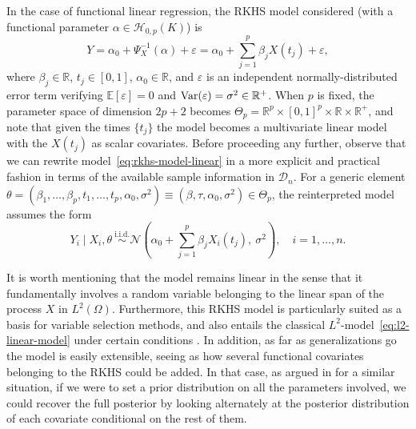 \documentclass[ba]{imsart}
\numberwithin{equation}{section}
\theoremstyle{plain}
\renewcommand{\epsilon}{\varepsilon}
\newcommand{\R}{\mathbb{R}}
\newcommand{\E}{\mathbb{E}}
\newcommand{\Var}{\ensuremath\operatorname{Var}}
\begin{document}
In the case of functional linear regression, the RKHS model considered (with a functional parameter \(\alpha\in \mathcal H_{0,p}(K)\)) is
\begin{equation}\label{eq:rkhs-model-linear}
  Y = \alpha_0 + \Psi^{-1}_X(\alpha) + \epsilon = \alpha_0 + \sum_{j=1}^p \beta_j X(t_j) + \epsilon,
\end{equation}
where \(\beta_j \in \R\), \(t_j \in [0, 1]\), \(\alpha_0\in\R\), and \(\epsilon\) is an independent normally-distributed error term verifying \(\E[\epsilon]=0\) and \(\Var(\epsilon)=\sigma^2\in \R^+\). When \(p\) is fixed, the parameter space of dimension \(2p + 2\) becomes \(\Theta_p = \R^p \times [0, 1]^p \times \R \times \R^+\), and note that given the times \(\{t_j\}\) the model becomes a multivariate linear model with the \(X(t_j)\) as scalar covariates. Before proceeding any further, observe that we can rewrite model~\eqref{eq:rkhs-model-linear} in a more explicit and practical fashion in terms of the available sample information in \(\mathcal D_n\). For a generic element \(\theta = (\beta_1,\dots, \beta_p, t_1,\dots, t_p, \alpha_0, \sigma^2) \equiv (\beta, \tau, \alpha_0, \sigma^2) \in \Theta_p\), the reinterpreted model assumes the form
\begin{equation}\label{eq:rkhs-model-linear-2}
  Y_i \mid X_i, \theta \ \stackrel{\text{i.i.d.}}{\sim} \mathcal N\left(\alpha_0 + \sum_{j=1}^p \beta_j X_i(t_j), \ \sigma^2\right), \quad i =1,\dots, n.
\end{equation}

It is worth mentioning that the model remains linear in the sense that it fundamentally involves a random variable belonging to the linear span of the process \(X\) in \(L^2(\Omega)\). Furthermore, this RKHS model is particularly suited as a basis for variable selection methods, and also entails the classical \(L^2\)-model~\eqref{eq:l2-linear-model} under certain conditions \citep[see][Sec.~3]{berrendero2020general}. In addition, as far as generalizations go the model is easily extensible, seeing as how several functional covariates belonging to the RKHS could be added. In that case, as argued in \citet{grollemund2019bayesian} for a similar situation, if we were to set a prior distribution on all the parameters involved, we could recover the full posterior by looking alternately at the posterior distribution of each covariate conditional on the rest of them.
\end{document}
